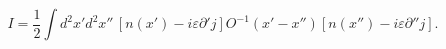 \begin{equation}
I=\frac{1}{2}\int d^2x' d^2x''\,[n(x')-i\varepsilon\partial' j ]
O^{-1}(x'-x'')[n(x'')-i\varepsilon\partial'' j ].
\label{expo}
\end{equation}

